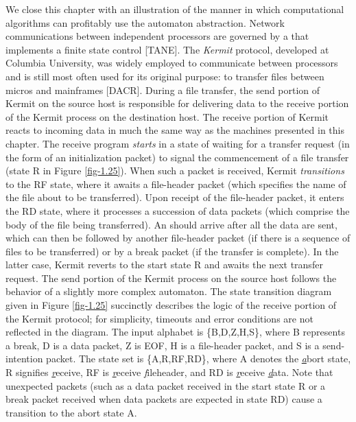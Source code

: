 We close this chapter with an illustration of the manner in which computational
algorithms can profitably use the automaton abstraction. Network communications
between independent processors are governed by a \emph{} that
implements a finite state control [TANE]. The \emph{Kermit} protocol,
developed at Columbia University, was widely employed to communicate between
processors and is still most often used for its original purpose: to transfer
files between micros and mainframes [DACR]. During a file transfer, the send
portion of Kermit on the source host is responsible for delivering data to the
receive portion of the Kermit process on the destination host. The receive
portion of Kermit reacts to incoming data in much the same way as the machines
presented in this chapter. The receive program \emph{starts} in a state of waiting for
a transfer request (in the form of an initialization packet) to signal the
commencement of a file transfer (state R in Figure \ref{fig-1.25}). When such
a packet is received, Kermit \emph{transitions} to the RF state, where it awaits a
file-header packet (which specifies the name of the file about to be transferred).
Upon receipt of the file-header packet, it enters the RD state, where it processes
a succession of data packets (which comprise the body of the file being
transferred). An  should arrive after all the data are sent, which can
then be followed by another file-header packet (if there is a sequence of files
to be transferred) or by a break packet (if the transfer is complete). In the
latter case, Kermit reverts to the start state R and awaits the next transfer
request. The send portion of the Kermit process on the source host follows the
behavior of a slightly more complex automaton. The state transition diagram
given in Figure \ref{fig-1.25} succinctly describes the logic of the receive
portion of the Kermit protocol; for simplicity, timeouts and error conditions
are not reflected in the diagram. The input alphabet is \{B,D,Z,H,S\}, where B
represents a break, D is a data packet, Z is EOF, H is a file-header packet, and
S is a send-intention packet. The state set is \{A,R,RF,RD\}, where A denotes
the \underline{\emph{a}}bort state, R signifies \underline{\emph{r}}eceive,
RF is \underline{\emph{r}}eceive \underline{\emph{f}}ileheader, and RD is
\underline{\emph{r}}eceive \underline{\emph{d}}ata. Note that unexpected packets (such as a data packet received in
the start state R or a break packet received when data packets are expected in
state RD) cause a transition to the abort state A.

